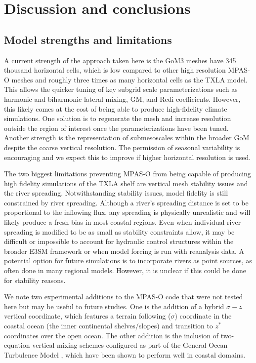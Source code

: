 \section{Discussion and conclusions}
\subsection{Model strengths and limitations}
A current strength of the approach taken here is the GoM3 meshes have 345 thousand horizontal cells, which is low compared to other high resolution MPAS-O meshes \citep{caldwell2019doe, hoch2020mpas} and roughly three times as many horizontal cells as the TXLA model. This allows the quicker tuning of key subgrid scale parameterizations such as harmonic and biharmonic lateral mixing, GM, and Redi coefficients. However, this likely comes at the cost of being able to produce high-fidelity climate simulations. One solution is to regenerate the mesh and increase resolution outside the region of interest once the parameterizations have been tuned. Another strength is the representation of submesoscales within the broader GoM despite the coarse vertical resolution. The permission of seasonal variability is encouraging and we expect this to improve if higher horizontal resolution is used. 

The two biggest limitations preventing MPAS-O from being capable of producing high fidelity simulations of the TXLA shelf are vertical mesh stability issues and the river spreading. Notwithstanding stability issues, model fidelity is still constrained by river spreading. Although a river's spreading distance is set to be proportional to the inflowing flux, any spreading is physically unrealistic and will likely produce a fresh bias in most coastal regions. Even when individual river spreading is modified to be as small as stability constraints allow, it may be difficult or impossible to account for hydraulic control structures within the broader E3SM framework or when model forcing is run with reanalysis data. A potential option for future simulations is to incorporate rivers as point sources, as often done in many regional models. However, it is unclear if this could be done for stability reasons.

We note two experimental additions to the MPAS-O code that were not tested here but may be useful to future studies. One is the addition of a hybrid $\sigma-z$ vertical coordinate, which features a terrain following ($\sigma$) coordinate in the coastal ocean (the inner continental shelves/slopes) and transition to $z^*$ coordinates over the open ocean. The other addition is the inclusion of two-equation vertical mixing schemes configured as part of the General Ocean Turbulence Model \citep{burchard1999gotm, Warner_2005}, which have been shown to perform well in coastal domains. 


